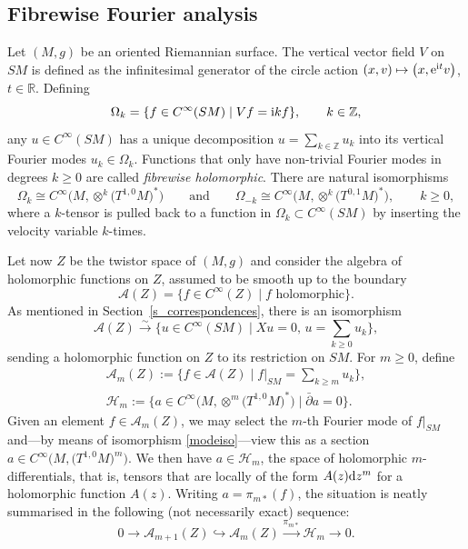 \documentclass[pdftex]{sigma}
\numberwithin{equation}{section}
\theoremstyle{definition}
\newcommand{\Z}{\mathbb{Z}} %
\newcommand{\R}{\mathbb{R}} %
\newcommand{\1}{{\bf 1}}
\begin{document}
\subsection{Fibrewise Fourier analysis}\label{s_ffa} Let $(M,g)$ be an oriented Riemannian surface. The vertical vector field $V$ on $SM$ is defined as the infinitesimal generator of the circle action $(x,v)\mapsto \bigl(x,{\rm e}^{{\rm i}t}v\bigr)$, $t\in \R$. Defining
\[
	\Omega_k=\{f\in C^\infty(SM)\mid Vf={\rm i}k f\},\qquad k\in \Z,
\]
any $u\in C^\infty(SM)$ has a unique decomposition $u=\sum_{k\in \Z}u_k$ into its vertical Fourier modes $u_k\in \Omega_k$. Functions that only have non-trivial Fourier modes in degrees $k\ge 0$ are called {\it fibrewise holomorphic}.
There are natural isomorphisms
\begin{equation}\label{modeiso}
	\Omega_k \cong C^\infty\bigl(M,\otimes^k \bigl(T^{1,0}M\bigr)^*\bigr)\qquad \text{and} \qquad \Omega_{-k} \cong C^\infty\bigl(M,\otimes^k \bigl(T^{0,1}M\bigr)^*\bigr),\qquad k\ge 0,
\end{equation}
where a $k$-tensor is pulled back to a function in $\Omega_k\subset C^\infty(SM)$ by inserting the velocity variable $k$-times.

Let now $Z$ be the twistor space of $(M,g)$ and consider the algebra of holomorphic functions on $Z$, assumed to be smooth up to the boundary
\[ \mathcal A(Z)=\{f\in C^\infty(Z)\mid f\text{ holomorphic}\}.\]
As mentioned in Section~\ref{s_correspondences}, there is an isomorphism
\begin{equation}\label{def_aoriginal}
\mathcal A(Z)\xrightarrow{\sim} \biggl\{u\in C^\infty(SM) \mid Xu=0,\, u={\sum_{k\ge 0}}u_k\biggr\},
\end{equation}
sending a holomorphic function on $Z$ to its restriction on $SM$. For $m\ge 0$, define
\begin{gather*}%
\mathcal A_m(Z):=\biggl\{f\in \mathcal A(Z)\mid f|_{SM}=\sum_{k\ge m}u_k\biggr\},\\
 \mathcal H_m := \big\{a\in C^\infty\bigl(M,\otimes^m\bigl(T^{1,0}M\bigr)^*\bigr)\mid \bar \partial a=0\big\}.
\end{gather*}
Given an element $f\in \mathcal A_m(Z)$, we may select the $m$-th Fourier mode of $f|_{SM}$ and---by means of isomorphism \eqref{modeiso}---view this as a section $a\in C^\infty\bigl(M,\bigl(T^{1,0}M\bigr)^m\bigr)$. We then have $a\in \mathcal H_m$, the space of holomorphic $m$-differentials, that is, tensors that are locally of the form $A(z) {\rm d}z^m$ for a holomorphic function $A(z)$.
Writing $a=\pi_{m*}(f)$, the situation is neatly summarised in the following (not necessarily exact) sequence:
\[%
	0 \rightarrow \mathcal A_{m+1}(Z) \hookrightarrow \mathcal A_m(Z) \xrightarrow{\pi_{m*}} \mathcal{H}_m\rightarrow 0.
\]
\end{document}
